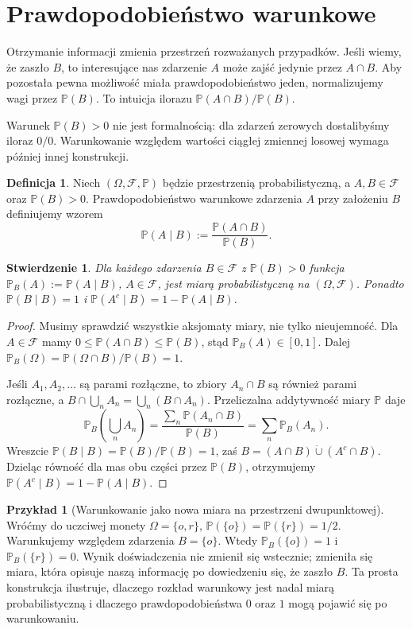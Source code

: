 \documentclass[11pt,a4paper,oneside]{report}
\numberwithin{equation}{chapter}
\theoremstyle{plain}
\newtheorem{stwierdzenie}[twierdzenie]{Stwierdzenie}
\theoremstyle{definition}
\newtheorem{definicja}{Definicja}[chapter]
\newtheorem{przyklad}{Przykład}[chapter]
\theoremstyle{remark}
\newcommand{\Prob}{\mathbb{P}}
\begin{document}
\section{Prawdopodobieństwo warunkowe}
Otrzymanie informacji zmienia przestrzeń rozważanych przypadków.
Jeśli wiemy, że zaszło $B$, to interesujące nas zdarzenie $A$
może zajść jedynie przez $A\cap B$. Aby pozostała pewna
możliwość miała prawdopodobieństwo jeden, normalizujemy
wagi przez $\Prob(B)$. To intuicja ilorazu
$\Prob(A\cap B)/\Prob(B)$.

Warunek $\Prob(B)>0$ nie jest formalnością: dla zdarzeń
zerowych dostalibyśmy iloraz $0/0$. Warunkowanie względem
wartości ciągłej zmiennej losowej wymaga później innej konstrukcji.

\begin{definicja}
Niech $(\Omega,\mathcal F,\Prob)$ będzie przestrzenią probabilistyczną,
a $A,B\in\mathcal F$ oraz $\Prob(B)>0$.
Prawdopodobieństwo warunkowe zdarzenia $A$ przy założeniu $B$
definiujemy wzorem
\begin{equation}\label{eq:cond}
\Prob(A\mid B):=\frac{\Prob(A\cap B)}{\Prob(B)}.
\end{equation}
\end{definicja}

\begin{stwierdzenie}
Dla każdego zdarzenia $B\in\mathcal F$ z $\Prob(B)>0$
funkcja $\Prob_B(A):=\Prob(A\mid B)$, $A\in\mathcal F$,
jest miarą probabilistyczną na $(\Omega,\mathcal F)$.
Ponadto $\Prob(B\mid B)=1$ i $\Prob(A^c\mid B)=1-\Prob(A\mid B)$.
\end{stwierdzenie}
\begin{proof}
Musimy sprawdzić wszystkie aksjomaty miary, nie tylko
nieujemność. Dla $A\in\mathcal F$ mamy
$0\leq\Prob(A\cap B)\leq\Prob(B)$, stąd
$\Prob_B(A)\in[0,1]$. Dalej
$\Prob_B(\Omega)=\Prob(\Omega\cap B)/\Prob(B)=1$.

Jeśli $A_1,A_2,\ldots$ są parami rozłączne, to zbiory
$A_n\cap B$ są również parami rozłączne, a
$B\cap\bigcup_n A_n=\bigcup_n(B\cap A_n)$.
Przeliczalna addytywność miary $\Prob$ daje
\[
\Prob_B\!\left(\bigcup_n A_n\right)
=\frac{\sum_n\Prob(A_n\cap B)}{\Prob(B)}
=\sum_n\Prob_B(A_n).
\]
Wreszcie $\Prob(B\mid B)=\Prob(B)/\Prob(B)=1$, zaś
$B=(A\cap B)\mathbin{\dot\cup}(A^c\cap B)$.
Dzieląc równość dla mas obu części przez $\Prob(B)$,
otrzymujemy $\Prob(A^c\mid B)=1-\Prob(A\mid B)$.
\end{proof}


\begin{przyklad}[Warunkowanie jako nowa miara na przestrzeni dwupunktowej]
Wróćmy do uczciwej monety
$\Omega=\{o,r\}$, $\Prob(\{o\})=\Prob(\{r\})=1/2$.
Warunkujemy względem zdarzenia $B=\{o\}$.
Wtedy $\Prob_B(\{o\})=1$ i $\Prob_B(\{r\})=0$.
Wynik doświadczenia nie zmienił się wstecznie;
zmieniła się miara, która opisuje naszą informację
po dowiedzeniu się, że zaszło $B$.
Ta prosta konstrukcja ilustruje, dlaczego rozkład warunkowy
jest nadal miarą probabilistyczną i dlaczego prawdopodobieństwa
$0$ oraz $1$ mogą pojawić się po warunkowaniu.
\end{przyklad}
\end{document}
